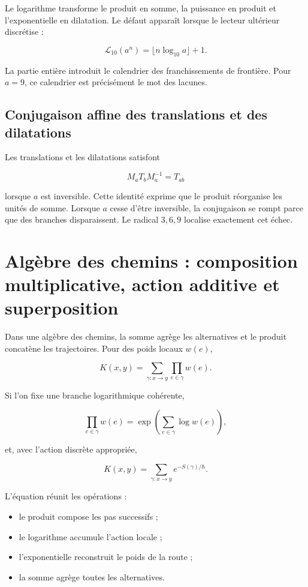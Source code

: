 Le logarithme transforme le produit en somme, la puissance en produit et l’exponentielle en dilatation. Le défaut apparaît lorsque le lecteur ultérieur discrétise :

\[
\mathcal L_{10}(a^n)
=\lfloor n\log_{10}a\rfloor+1.
\]

La partie entière introduit le calendrier des franchissements de frontière. Pour \(a=9\), ce calendrier est précisément le mot des lacunes.

\subsection{Conjugaison affine des translations et des dilatations}

Les translations et les dilatations satisfont

\[
M_aT_bM_a^{-1}=T_{ab}
\]

lorsque \(a\) est inversible. Cette identité exprime que le produit réorganise les unités de somme. Lorsque \(a\) cesse d’être inversible, la conjugaison se rompt parce que des branches disparaissent. Le radical \(3,6,9\) localise exactement cet échec.


\section{Algèbre des chemins : composition multiplicative, action additive et superposition}

Dans une algèbre des chemins, la somme agrège les alternatives et le produit concatène les trajectoires. Pour des poids locaux \(w(e)\),

\[
K(x,y)
=\sum_{\gamma:x\to y}
\prod_{e\in\gamma}w(e).
\]

Si l’on fixe une branche logarithmique cohérente,

\[
\prod_{e\in\gamma}w(e)
=\exp\!\left(\sum_{e\in\gamma}\log w(e)\right),
\]

et, avec l’action discrète appropriée,

\[
K(x,y)=\sum_{\gamma:x\to y}e^{-S(\gamma)/\hbar}.
\]

L’équation réunit les opérations :

\begin{itemize}
\item le produit compose les pas successifs ;
\item le logarithme accumule l’action locale ;
\item l’exponentielle reconstruit le poids de la route ;
\item la somme agrège toutes les alternatives.
\end{itemize}

